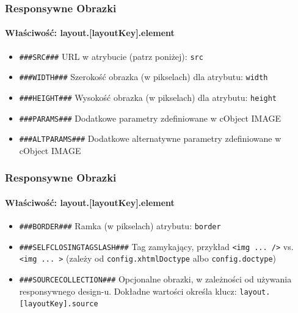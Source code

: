 
\begin{frame}[fragile]
	\frametitle{Responsywne Obrazki}
	\framesubtitle{Właściwość: layout.[layoutKey].element}

	\begin{itemize}
		\item \lstinline!###SRC###!\newline
			URL w atrybucie (patrz poniżej): \texttt{src}

		\item \lstinline!###WIDTH###!\newline
			Szerokość obrazka (w pikselach) dla atrybutu: \texttt{width}

		\item \lstinline!###HEIGHT###!\newline
			Wysokość obrazka (w pikselach) dla atrybutu: \texttt{height}

		\item \lstinline!###PARAMS###!\newline
			Dodatkowe parametry zdefiniowane w cObject IMAGE

		\item \lstinline!###ALTPARAMS###!\newline
		Dodatkowe alternatywne parametry zdefiniowane w cObject IMAGE
	\end{itemize}

\end{frame}


\begin{frame}[fragile]
	\frametitle{Responsywne Obrazki}
	\framesubtitle{Właściwość: layout.[layoutKey].element}

	\begin{itemize}
		\item \lstinline!###BORDER###!\newline
			Ramka (w pikselach) atrybutu: \texttt{border}

		\item \lstinline!###SELFCLOSINGTAGSLASH###!\newline
			Tag zamykający, przykład \texttt{<img ... />} vs. \texttt{<img ... >}\newline
			(zależy od \texttt{config.xhtmlDoctype} albo \texttt{config.doctype})

		\item \lstinline!###SOURCECOLLECTION###!\newline
			Opcjonalne obrazki, w zależności od używania responsywnego design-u.
			Dokładne wartości określa klucz: \texttt{layout.[layoutKey].source}
	\end{itemize}

\end{frame}


